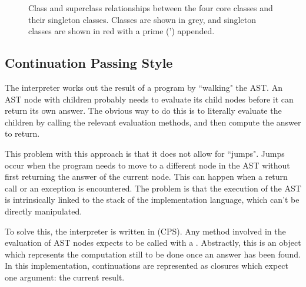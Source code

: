 \begin{figure}
\begin{center}
\caption{Class and superclass relationships between the four core classes and their singleton classes. Classes are shown in grey, and singleton classes are shown in red with a prime (') appended.}
\label{fig:core_relationships}
\end{center}
\end{figure}

\subsection{Continuation Passing Style}

The interpreter works out the result of a program by ``walking" the AST. An AST node with children probably needs to evaluate its child nodes before it can return its own answer. The obvious way to do this is to literally evaluate the children by calling the relevant evaluation methods, and then compute the answer to return.

This problem with this approach is that it does not allow for ``jumps". Jumps occur when the program needs to move to a different node in the AST without first returning the answer of the current node. This can happen when a return call or an exception is encountered. The problem is that the execution of the AST is intrinsically linked to the stack of the implementation language, which can't be directly manipulated.

To solve this, the interpreter is written in  (CPS). Any method involved in the evaluation of AST nodes expects to be called with a . Abstractly, this is an object which represents the computation still to be done once an answer has been found. In this implementation, continuations are represented as closures which expect one argument: the current result.

